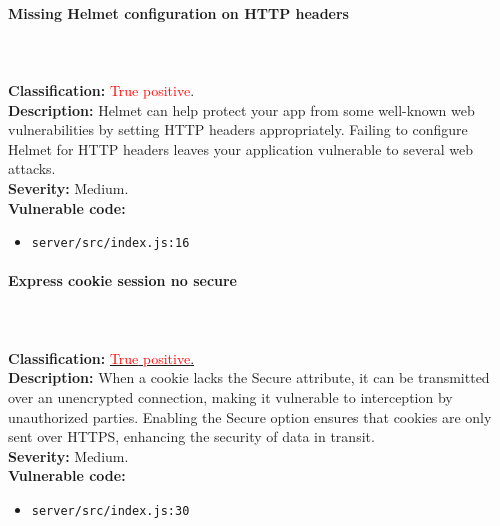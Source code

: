 \documentclass[]{article}
\begin{document}
\paragraph{Missing Helmet configuration on HTTP headers} \mbox{} \\ \\
\textbf{Classification:} \textcolor{red}{True} \textcolor{red}{positive}. \\
\textbf{Description:} Helmet can help protect your app from some well-known web vulnerabilities by setting HTTP headers appropriately. Failing to configure Helmet for HTTP headers leaves your application vulnerable to several web attacks. \\ 
\textbf{Severity:} Medium. \\ 
\textbf{Vulnerable code:}
\begin{itemize}
    \item \texttt{server/src/index.js:16}
\end{itemize}

\paragraph{Express cookie session no secure} \mbox{} \\ \\
\textbf{Classification:} \hyperref[subsubsec:sensitive_cookie_without_secure_and_httponly_attributes]{\textcolor{red}{True} \textcolor{red}{positive}.} \\
\textbf{Description:} When a cookie lacks the Secure attribute, it can be transmitted over an unencrypted connection, making it vulnerable to interception by unauthorized parties. Enabling the Secure option ensures that cookies are only sent over HTTPS, enhancing the security of data in transit. \\ 
\textbf{Severity:} Medium. \\ 
\textbf{Vulnerable code:}
\begin{itemize}
    \item \texttt{server/src/index.js:30}
\end{itemize}
\end{document}
